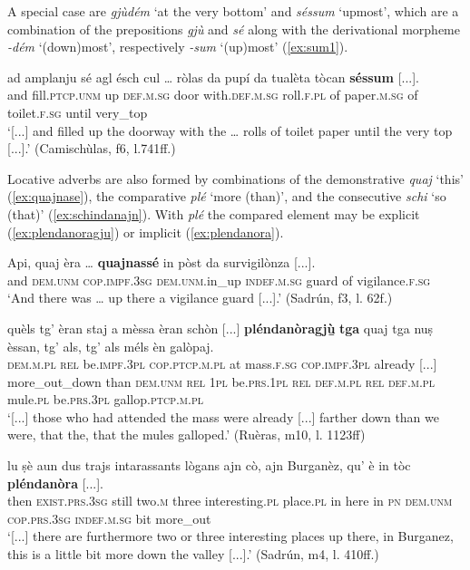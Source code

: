 A special case are \textit{gjùdém} `at the very bottom' and \textit{séssum} `upmost', which are a combination of the prepositions \textit{gjù} and \textit{sé} along with the derivational morpheme \textit{-dém} `(down)most', respectively \textit{-sum} `(up)most' (\ref{ex:sum1}).

\ea
\label{ex:sum1}
\gll [...] ad amplanju sé agl ésch cul … ròlas da pupí da tualèta tòcan \textbf{séssum} [...].\\
{} and fill.\textsc{ptcp.unm} up \textsc{def.m.sg} door with.\textsc{def.m.sg} {} roll.\textsc{f.pl} of paper.\textsc{m.sg} of toilet.\textsc{f.sg} until very\_top\\
\glt `[...] and filled up the doorway with the … rolls of toilet paper until the very top [...].' (Camischùlas, f6, l.741ff.)
\z

Locative adverbs are also formed by combinations of the demonstrative \textit{quaj} `this' (\ref{ex:quajnase}), the comparative \textit{plé} `more (than)', and the consecutive \textit{schi} `so (that)' (\ref{ex:schindanajn}). With \textit{plé} the compared element may be explicit (\ref{ex:plendanoragju}) or implicit (\ref{ex:plendanora}).

\ea
\label{ex:quajnase}
\gll  Api, quaj èra … \textbf{quajnassé} in pòst da survigilònza [...].\\
and \textsc{dem.unm} \textsc{cop.impf.3sg} {} \textsc{dem.unm}.in\_up \textsc{indef.m.sg} guard of vigilance.\textsc{f.sg}\\
\glt `And there was … up there a vigilance guard [...].' (Sadrún, f3, l. 62f.)
\z

\ea
\label{ex:plendanoragju}
\gll  [...] quèls tg’ èran staj a mèssa èran schòn [...] \textbf{pléndanòragjù̱} \textbf{tga} quaj tga nuṣ èssan, tg’ als, tg’ als méls èn galòpaj.\\
{} \textsc{dem.m.pl} \textsc{rel} be.\textsc{impf.3pl} \textsc{cop.ptcp.m.pl} at mass.\textsc{f.sg} \textsc{cop.impf.3pl} already [...] more\_out\_down than \textsc{dem.unm} \textsc{rel} \textsc{1pl} be.\textsc{prs.1pl} \textsc{rel} \textsc{def.m.pl} \textsc{rel} \textsc{def.m.pl} mule.\textsc{pl} be.\textsc{prs.3pl} gallop.\textsc{ptcp.m.pl}\\
\glt `[...] those who had attended the mass were already [...] farther down than we were, that the, that the mules galloped.' (Ruèras, m10, l. 1123ff)
\z

\ea
\label{ex:plendanora}
\gll [...] lu ṣè aun dus trajs intarassants lògans ajn cò, ajn Burganèz, qu' è in tòc \textbf{pléndanòra} [...].\\
{}  then \textsc{exist.prs.3sg} still two.\textsc{m} three interesting.\textsc{pl} place.\textsc{pl} in here in \textsc{pn} \textsc{dem.unm} \textsc{cop.prs.3sg} \textsc{indef.m.sg} bit more\_out \\
\glt `[...] there are furthermore two or three interesting places up there, in Burganez, this is a little bit more down the valley [...].' (Sadrún, m4, l. 410ff.)
\z

